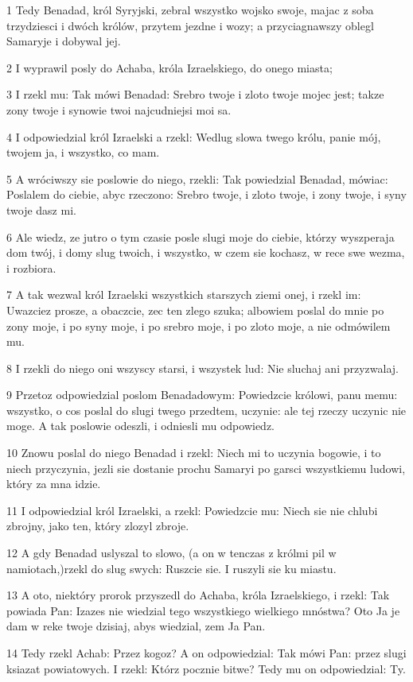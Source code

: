 \par 1 Tedy Benadad, król Syryjski, zebral wszystko wojsko swoje, majac z soba trzydziesci i dwóch królów, przytem jezdne i wozy; a przyciagnawszy oblegl Samaryje i dobywal jej.
\par 2 I wyprawil posly do Achaba, króla Izraelskiego, do onego miasta;
\par 3 I rzekl mu: Tak mówi Benadad: Srebro twoje i zloto twoje mojec jest; takze zony twoje i synowie twoi najcudniejsi moi sa.
\par 4 I odpowiedzial król Izraelski a rzekl: Wedlug slowa twego królu, panie mój, twojem ja, i wszystko, co mam.
\par 5 A wróciwszy sie poslowie do niego, rzekli: Tak powiedzial Benadad, mówiac: Poslalem do ciebie, abyc rzeczono: Srebro twoje, i zloto twoje, i zony twoje, i syny twoje dasz mi.
\par 6 Ale wiedz, ze jutro o tym czasie posle slugi moje do ciebie, którzy wyszperaja dom twój, i domy slug twoich, i wszystko, w czem sie kochasz, w rece swe wezma, i rozbiora.
\par 7 A tak wezwal król Izraelski wszystkich starszych ziemi onej, i rzekl im: Uwazciez prosze, a obaczcie, zec ten zlego szuka; albowiem poslal do mnie po zony moje, i po syny moje, i po srebro moje, i po zloto moje, a nie odmówilem mu.
\par 8 I rzekli do niego oni wszyscy starsi, i wszystek lud: Nie sluchaj ani przyzwalaj.
\par 9 Przetoz odpowiedzial poslom Benadadowym: Powiedzcie królowi, panu memu: wszystko, o cos poslal do slugi twego przedtem, uczynie: ale tej rzeczy uczynic nie moge. A tak poslowie odeszli, i odniesli mu odpowiedz.
\par 10 Znowu poslal do niego Benadad i rzekl: Niech mi to uczynia bogowie, i to niech przyczynia, jezli sie dostanie prochu Samaryi po garsci wszystkiemu ludowi, który za mna idzie.
\par 11 I odpowiedzial król Izraelski, a rzekl: Powiedzcie mu: Niech sie nie chlubi zbrojny, jako ten, który zlozyl zbroje.
\par 12 A gdy Benadad uslyszal to slowo, (a on w tenczas z królmi pil w namiotach,)rzekl do slug swych: Ruszcie sie. I ruszyli sie ku miastu.
\par 13 A oto, niektóry prorok przyszedl do Achaba, króla Izraelskiego, i rzekl: Tak powiada Pan: Izazes nie wiedzial tego wszystkiego wielkiego mnóstwa? Oto Ja je dam w reke twoje dzisiaj, abys wiedzial, zem Ja Pan.
\par 14 Tedy rzekl Achab: Przez kogoz? A on odpowiedzial: Tak mówi Pan: przez slugi ksiazat powiatowych. I rzekl: Którz pocznie bitwe? Tedy mu on odpowiedzial: Ty.
